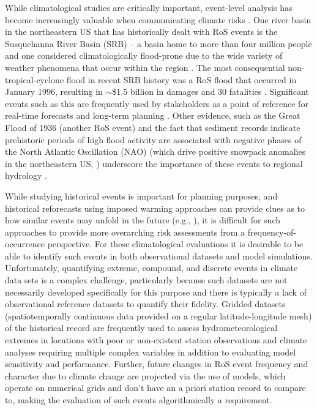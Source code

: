 \documentclass[nhess, manuscript]{copernicus}
\begin{document}
While climatological studies are critically important, event-level analysis has become increasingly valuable when communicating climate risks \citep{shepherd2018storylines}.
One river basin in the northeastern US that has historically dealt with RoS events is the Susquehanna River Basin (SRB) -- a basin home to more than four million people \citep{leathers2008hydroclimatic} and one considered climatologically flood-prone due to the wide variety of weather phenomena that occur within the region \citep{perry2000significant}.
The most consequential non-tropical-cyclone flood in recent SRB history was a RoS flood that occurred in January 1996, resulting in $\sim$\$1.5 billion in damages and 30 fatalities \citep{leathers1998severe}. Significant events such as this are frequently used by stakeholders as a point of reference for real-time forecasts and long-term planning \citep{george2019the}.
Other evidence, such as the Great Flood of 1936 (another RoS event) and the fact that sediment records indicate prehistoric periods of high flood activity are associated with negative phases of the North Atlantic Oscillation (NAO) (which drive positive snowpack anomalies in the northeastern US, \citep{hartley1998synoptic}) underscore the importance of these events to regional hydrology \citep{toomey2019the}.

While studying historical events is important for planning purposes, and historical reforecasts using imposed warming approaches can provide clues as to how similar events may unfold in the future (e.g., \citet{pettett2023the}), it is difficult for such approaches to provide more overarching risk assessments from a frequency-of-occurrence perspective. For these climatological evaluations it is desirable to be able to identify such events in both observational datasets and model simulations. 
Unfortunately, quantifying extreme, compound, and discrete events in climate data sets is a complex challenge, particularly because such datasets are not necessarily developed specifically for this purpose and there is typically a lack of observational reference datasets to quantify their fidelity.
Gridded datasets (spatiotemporally continuous data provided on a regular latitude-longitude mesh) of the historical record are frequently used to assess hydrometeorological extremes in locations with poor or non-existent station observations and climate analyses requiring multiple complex variables in addition to evaluating model sensitivity and performance.
Further, future changes in RoS event frequency and character due to climate change are projected via the use of models, which operate on numerical grids and don't have an a priori station record to compare to, making the evaluation of such events algorithmically a requirement.
\end{document}
